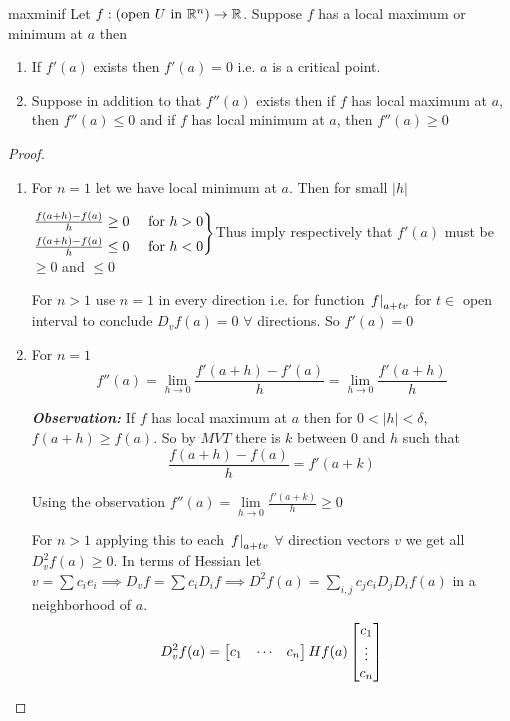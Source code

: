\begin{theorem}{}{maxminif}
Let $f:(\text{open }U\text{ in }\mathbb{R}^n )\to \mathbb{R}$. Suppose $f $ has a local maximum or minimum  at $a$  then \begin{enumerate}[label=\bfseries\tiny\protect\circled{\small\arabic*}]
	\item If $f'(a)$ exists then $f'(a)=0$ i.e. $a$ is a critical point. 
	\item Suppose in addition to that $f''(a)$  exists then if $f$ has local maximum at $a$, then $f''(a)\leq 0$ and if $f$ has local minimum at $a$, then $f''(a)\geq 0$
\end{enumerate}
\end{theorem}
\begin{proof}
	\begin{enumerate}[label=\bfseries\tiny\protect\circled{\small\arabic*}]
		\item For $n=1$  let we have local minimum at $a$. Then for small $|h|$
		
		\begin{center}
			 $\begin{rcases}
			 	\frac{f(a+h)-f(a)}{h}\geq 0 & \text{ for }h>0 \\
			 	\frac{f(a+h)-f(a)}{h}\leq 0 & \text{ for }h<0
			 \end{rcases}$Thus imply respectively that $f'(a)$  must be $\geq 0$ and $\leq 0$
		\end{center}
	For $n>1$  use $n=1$ in every direction i.e. for function $\left. f\right|_{a+tv}$ for $t\in $ open interval  to conclude $D_vf(a)=0$ $\forall$ directions. So $f'(a)=0$\Qed
	\item For $n=1$ $$f''(a)=\lim\limits_{h\to 0}\frac{f'(a+h)-f'(a)}{h}=\lim\limits_{h\to 0}\frac{f'(a+h)}{h}$$ 
	\parinf 
	
	\textbf{\textit{Observation: }}If $f$ has local maximum at $a$ then for $0<|h|<\delta$, $f(a+h)\geq f(a)$. So by $MVT$  there is $k$ between $0$ and $h$  such that $$\frac{f(a+h)-f(a)}{h}=f'(a+k)$$\parinn
	
	Using the observation $f''(a)=\lim\limits_{h\to 0}\frac{f'(a+k)}{h}\geq 0$
	
	For $n>1$ applying this  to each $\left. f\right|_{a+tv}$ $\forall$ direction vectors $v$  we get all $D^2_vf(a)\geq 0$. In terms of Hessian  let $v=\sum c_ie_i\implies D_vf=\sum c_iD_if\implies D^2f(a)=\sum_{i,j}c_jc_iD_jD_if(a) $ in  a neighborhood of $a$. $$D^2_vf(a)=\left[ \begin{matrix}
		c_1 & \cdots & c_n
	\end{matrix} \right]Hf(a)\left[ \begin{matrix}
	c_1\\ \vdots\\ c_n
\end{matrix} \right]$$
	\end{enumerate}
\end{proof}

